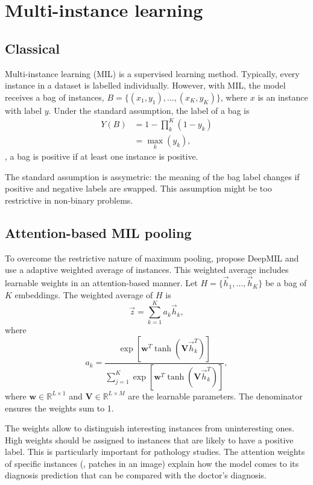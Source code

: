 \section{Multi-instance learning}

\subsection{Classical}
Multi-instance learning (MIL) is a supervised learning method.
Typically, every instance in a dataset is labelled individually.
However, with MIL, the model receives a bag of instances, $B=\{(x_1,y_1),\ldots,(x_K,y_K)\}$, where $x$ is an instance with label $y$.
Under the standard assumption, the label of a bag is
\begin{align}
    Y(B) &= 1 - \prod_{k}^{K}(1-y_k) \\
         &= \max_k(y_k),
\end{align}
\ie, a bag is positive if at least one instance is positive.

The standard assumption is assymetric: the meaning of the bag label changes if positive and negative labels are swapped.
This assumption might be too restrictive in non-binary problems.


\subsection{Attention-based MIL pooling}
To overcome the restrictive nature of maximum pooling, \textcite{Ilse2018} propose DeepMIL and use a adaptive weighted average of instances.
This weighted average includes learnable weights in an attention-based manner.
Let $H=\{\vec{h}_1, \ldots, \vec{h}_K\}$ be a bag of $K$ embeddings.
The weighted average of $H$ is
\begin{equation}
    \vec{z}=\sum_{k=1}^{K}a_k\vec{h}_k,
\end{equation}
where
\begin{equation}
    a_k = \frac{\exp\left[\mathbf{w}^T \tanh (\mathbf{V}\vec{h}_k^T)\right]}{\sum_{j=1}^{K}\exp\left[\mathbf{w}^T \tanh (\mathbf{V}\vec{h}_k^T)\right]},
\end{equation}
where $\mathbf{w} \in \mathbb{R}^{L \times 1}$ and $\mathbf{V}\in \mathbb{R}^{L \times M}$ are the learnable parameters.
The denominator ensures the weights sum to 1.

The weights allow to distinguish interesting instances from uninteresting ones.
High weights should be assigned to instances that are likely to have a positive label.
This is particularly important for pathology studies.
The attention weights of specific instances (\eg, patches in an image) explain how the model comes to its diagnosis prediction that can be compared with the doctor's diagnosis.

